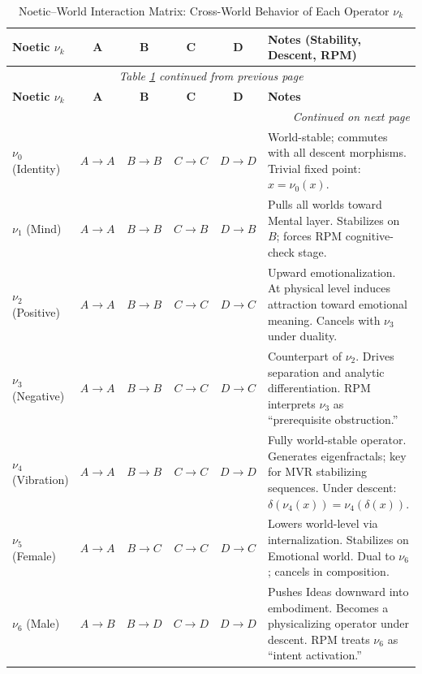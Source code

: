 \begin{longtable}{p{1.5cm}|c|c|c|c|p{4.5cm}}
\caption{Noetic--World Interaction Matrix: Cross-World Behavior of Each Operator $\nu_k$}
\label{tab:noetic-world-matrix} \\
\toprule
\textbf{Noetic $\nu_k$}
& \textbf{A}
& \textbf{B}
& \textbf{C}
& \textbf{D}
& \textbf{Notes (Stability, Descent, RPM)}
\\
\midrule
\endfirsthead
\multicolumn{6}{c}{\textit{Table \ref{tab:noetic-world-matrix} continued from previous page}} \\
\toprule
\textbf{Noetic $\nu_k$}
& \textbf{A}
& \textbf{B}
& \textbf{C}
& \textbf{D}
& \textbf{Notes}
\\
\midrule
\endhead
\midrule
\multicolumn{6}{r}{\textit{Continued on next page}} \\
\endfoot
\bottomrule
\endlastfoot

$\nu_0$ (Identity)
& $A \to A$
& $B \to B$
& $C \to C$
& $D \to D$
& World-stable; commutes with all descent morphisms.
Trivial fixed point: $x = \nu_0(x)$.
\\
\midrule

$\nu_1$ (Mind)
& $A \to A$
& $B \to B$
& $C \to B$
& $D \to B$
& Pulls all worlds toward Mental layer.
Stabilizes on $B$; forces RPM cognitive-check stage.
\\
\midrule

$\nu_2$ (Positive)
& $A \to A$
& $B \to B$
& $C \to C$
& $D \to C$
& Upward emotionalization.
At physical level induces attraction toward emotional meaning.
Cancels with $\nu_3$ under duality.
\\
\midrule

$\nu_3$ (Negative)
& $A \to A$
& $B \to B$
& $C \to C$
& $D \to C$
& Counterpart of $\nu_2$.
Drives separation and analytic differentiation.
RPM interprets $\nu_3$ as ``prerequisite obstruction.''
\\
\midrule

$\nu_4$ (Vibration)
& $A \to A$
& $B \to B$
& $C \to C$
& $D \to D$
& Fully world-stable operator.
Generates eigenfractals; key for MVR stabilizing sequences.
Under descent: $\delta(\nu_4(x)) = \nu_4(\delta(x))$.
\\
\midrule

$\nu_5$ (Female)
& $A \to A$
& $B \to C$
& $C \to C$
& $D \to C$
& Lowers world-level via internalization.
Stabilizes on Emotional world.
Dual to $\nu_6$; cancels in composition.
\\
\midrule

$\nu_6$ (Male)
& $A \to B$
& $B \to D$
& $C \to D$
& $D \to D$
& Pushes Ideas downward into embodiment.
Becomes a physicalizing operator under descent.
RPM treats $\nu_6$ as ``intent activation.''
\\
\midrule


\end{longtable}
